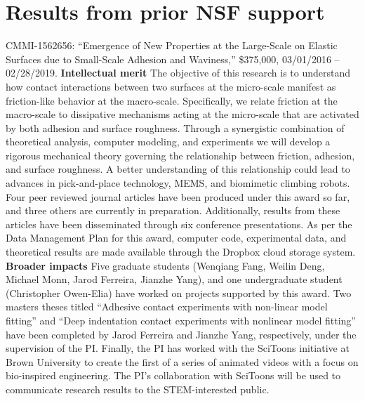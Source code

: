 \documentclass[10pt,letterpaper]{article}
\begin{document}
\section{Results from prior NSF support}
  \label{s:priorfund}
  CMMI-1562656: ``Emergence of New Properties at the Large-Scale on Elastic Surfaces due to  Small-Scale Adhesion and Waviness,'' \$375,000, 03/01/2016 -- 02/28/2019. \textbf{Intellectual merit} The objective of this research is to understand how contact interactions between two surfaces at the micro-scale manifest as friction-like behavior at the macro-scale. Specifically, we relate friction at the macro-scale to dissipative mechanisms acting at the micro-scale that are activated by both adhesion and surface roughness. Through a synergistic combination of theoretical analysis, computer modeling, and experiments we will develop a rigorous mechanical theory governing the relationship between friction, adhesion, and surface roughness. A better understanding of this relationship could lead to advances in pick-and-place technology, MEMS, and biomimetic climbing robots. Four peer reviewed journal articles have been produced under this award so far, and three others are currently in preparation. Additionally, results from these articles have been disseminated through six conference presentations. As per the Data Management Plan for this award, computer code, experimental data, and theoretical results are made available through the Dropbox cloud storage system. \textbf{Broader impacts} Five graduate students (Wenqiang Fang, Weilin Deng, Michael Monn, Jarod Ferreira, Jianzhe Yang), and one undergraduate student (Christopher Owen-Elia) have worked on projects supported by this award. Two masters theses titled ``Adhesive contact experiments with non-linear model fitting''  and ``Deep indentation contact experiments with nonlinear model fitting'' have been completed by Jarod Ferreira and Jianzhe Yang, respectively, under the supervision of the PI. Finally, the PI has worked with the SciToons initiative at Brown University to create the first of a series of animated videos with a focus on bio-inspired engineering. The PI's collaboration with SciToons will be used to communicate research results to the STEM-interested public.

\clearpage
\setcounter{page}{1}
\pagestyle{plain}


\end{document}
